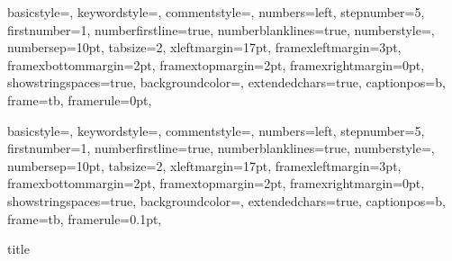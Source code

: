 \documentclass[a4paper,onecolumn,twoside,openright,11pt,wide,floatssmall]{mwrep}
\theoremstyle{definition}
\theoremstyle{plain}%
\theoremstyle{remark}
\begin{document}
{
basicstyle={\footnotesize},
keywordstyle={\bf\footnotesize\color{blue}},
commentstyle={\em\footnotesize\color{magenta}},
numbers=left,
stepnumber=5,
firstnumber=1,
numberfirstline=true,
numberblanklines=true,
numberstyle={\sf\tiny},
numbersep=10pt,
tabsize=2,
xleftmargin=17pt,
framexleftmargin=3pt,
framexbottommargin=2pt,
framextopmargin=2pt,
framexrightmargin=0pt,
showstringspaces=true,
backgroundcolor={\color{ListingBackground}},
extendedchars=true,
captionpos=b,
frame=tb,
framerule=0pt,
}

{
basicstyle={\footnotesize},
keywordstyle={\bf\footnotesize\color{blue}},
commentstyle={\em\footnotesize\color{magenta}},
numbers=left,
stepnumber=5,
firstnumber=1,
numberfirstline=true,
numberblanklines=true,
numberstyle={\sf\tiny},
numbersep=10pt,
tabsize=2,
xleftmargin=17pt,
framexleftmargin=3pt,
framexbottommargin=2pt,
framextopmargin=2pt,
framexrightmargin=0pt,
showstringspaces=true,
backgroundcolor={\color{ListingBackground}},
extendedchars=true,
captionpos=b,
frame=tb,
framerule=0.1pt,
}

\renewcommand*\lstlistingname{Wydruk}
\renewcommand*\lstlistlistingname{Spis wydruków}

\renewcommand{\baselinestretch}{1.0}
\raggedbottom
 {title}



\tableofcontents


\newpage
{}
\raggedbottom{}
\setcounter{page}{1}













\end{document}
